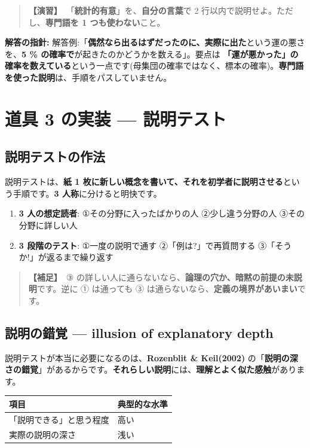 \documentclass{article}
\begin{document}
\begin{quote}
\textbf{【演習】}\ 「\textbf{統計的有意}」を、\textbf{自分の言葉}で 2 行以内で説明せよ。ただし、\textbf{専門語を 1 つも使わない}こと。
\end{quote}

\textbf{解答の指針:} 解答例:「\textbf{偶然なら出るはずだったのに、実際に出た}という運の悪さを、\textbf{5 \% の確率で}が起きたのかどうかを数える」。要点は \textbf{「運が悪かった」の確率を数えている}という一点です(母集団の確率ではなく、標本の確率)。\textbf{専門語を使った説明}は、手順をパスしていません。

\section{道具 3 の実装 — 説明テスト}

\subsection{説明テストの作法}

説明テストは、\textbf{紙 1 枚に新しい概念を書いて、それを初学者に説明させる}という手順です。\textbf{3 人称}に分けると明快です。

\begin{enumerate}
\item \textbf{3 人の想定読者}: ①その分野に入ったばかりの人 ②少し違う分野の人 ③その分野に詳しい人
\item \textbf{3 段階のテスト}: ①一度の説明で通す ②「例は?」で再質問する ③「そうか!」が返るまで繰り返す
\end{enumerate}

\begin{quote}
\textbf{【補足】}\ ③ の詳しい人に通らないなら、\textbf{論理の穴か、暗黙の前提の未説明}です。逆に ① は通っても ③ は通らないなら、\textbf{定義の境界があいまい}です。
\end{quote}

\subsection{説明の錯覚 — illusion of explanatory depth}

説明テストが本当に必要になるのは、\textbf{Rozenblit \& Keil(2002)} の「\textbf{説明の深さの錯覚}」があるからです。\textbf{それらしい説明}には、\textbf{理解とよく似た感触}があります。

\begin{center}
\begin{tabular}{|l|l|}
\hline
項目 & 典型的な水準 \\
\hline
「説明できる」と思う程度 & 高い \\
\hline
実際の説明の深さ & 浅い \\
\hline
\end{tabular}
\end{center}
\end{document}
